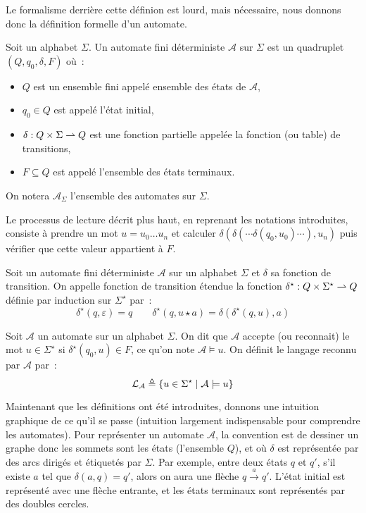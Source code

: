Le formalisme derrière cette définion est lourd, mais nécessaire, nous donnons
donc la définition formelle d'un automate.

\begin{definition}
  Soit un alphabet $\Sigma$. Un automate fini déterministe $\mathcal A$ sur
  $\Sigma$ est un quadruplet $(Q,q_0,\delta,F)$ où~:
  \begin{itemize}
  \item $Q$ est un ensemble fini appelé ensemble des états de $\mathcal A$,
  \item $q_0 \in Q$ est appelé l'état initial,
  \item $\delta : Q\times \Sigma \rightharpoonup Q$ est une fonction partielle
    appelée la fonction (ou table) de transitions,
  \item $F \subseteq Q$ est appelé l'ensemble des états terminaux.
  \end{itemize}

  On notera $\mathcal A_\Sigma$ l'ensemble des automates sur $\Sigma$.
\end{definition}

Le processus de lecture décrit plus haut, en reprenant les notations
introduites, consiste à prendre un mot $u = u_0\ldots u_n$ et calculer
$\delta(\delta(\cdots\delta(q_0,u_0)\cdots),u_n)$ puis vérifier que cette
valeur appartient à $F$.

\begin{definition}
  Soit un automate fini déterministe $\mathcal A$ sur un alphabet $\Sigma$ et
  $\delta$ sa fonction de transition. On appelle fonction de transition
  étendue la fonction $\delta^\star : Q \times \Sigma^\star \rightharpoonup Q$ définie
  par induction sur $\Sigma^\star$ par~:
  \[\delta^\star (q,\varepsilon) = q \qquad
  \delta^\star (q,u\star a) = \delta(\delta^\star(q,u),a)\]
\end{definition}

\begin{definition}
  Soit $\mathcal A$ un automate sur un alphabet $\Sigma$. On dit que
  $\mathcal A$ accepte (ou reconnait) le mot $u \in \Sigma^\star$ si
  $\delta^\star(q_0,u) \in F$, ce qu'on note $\mathcal A \models u$. On définit
  le langage reconnu par $\mathcal A$ par~:
  \[\mathcal L_\mathcal A \triangleq \{u \in \Sigma^\star
  \mid \mathcal A \models u\}\]
\end{definition}

Maintenant que les définitions ont été introduites, donnons une intuition
graphique de ce qu'il se passe (intuition largement indispensable pour
comprendre les automates). Pour représenter un automate $\mathcal A$, la
convention est de dessiner un graphe donc les sommets sont les états (l'ensemble
$Q$), et où $\delta$ est représentée par des arcs dirigés et étiquetés par
$\Sigma$. Par exemple, entre deux états $q$ et $q'$, s'il existe $a$ tel que
$\delta(a,q) = q'$, alors on aura une flèche $q \xrightarrow{a} q'$. L'état
initial est représenté avec une flèche entrante, et les états terminaux sont
représentés par des doubles cercles.

